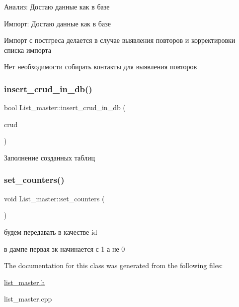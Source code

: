 Анализ\+: Достаю данные как в базе

Импорт\+: Достаю данные как в базе

Импорт с постгреса делается в случае выявления повторов и корректировки списка импорта

Нет необходимости собирать контакты для выявления повторов \mbox{\label{class_list__master_a86f1c83211c6f95e78662a17adf3696b}} 
\subsubsection{\texorpdfstring{insert\_crud\_in\_db()}{insert\_crud\_in\_db()}}
{\footnotesize\ttfamily bool List\+\_\+master\+::insert\+\_\+crud\+\_\+in\+\_\+db (\begin{DoxyParamCaption}\item[{Q\+List$<$ \mbox{\hyperlink{class_crud}{Crud}} $\ast$ $>$ $\ast$}]{crud }\end{DoxyParamCaption})}

Заполнение созданных таблиц \mbox{\label{class_list__master_af654639e0d014ff93c6dfd1f6a6d44c4}} 
\subsubsection{\texorpdfstring{set\_counters()}{set\_counters()}}
{\footnotesize\ttfamily void List\+\_\+master\+::set\+\_\+counters (\begin{DoxyParamCaption}{ }\end{DoxyParamCaption})}

будем передавать в качестве id

в дампе первая зк начинается с 1 а не 0 

The documentation for this class was generated from the following files\+:\begin{DoxyCompactItemize}
\item 
\mbox{\hyperlink{list__master_8h}{list\+\_\+master.\+h}}\item 
list\+\_\+master.\+cpp\end{DoxyCompactItemize}
